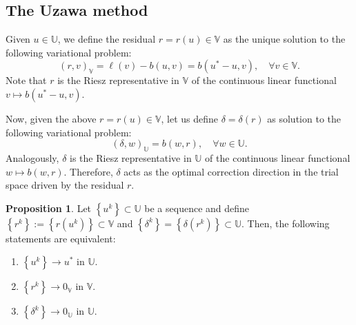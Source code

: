 \documentclass{article}
\theoremstyle{definition}
\newtheorem{proposition}{Proposition}
\begin{document}
\subsection{The Uzawa method}
Given $u\in\mathbb U$, we define the residual $r=r(u)\in\mathbb V$ as the unique solution to the following variational problem:
\begin{equation}\label{eq:residual}
(r,v)_{\mathbb{V}} = \ell(v) - b(u,v)=b(u^*-u,v), \quad \forall v\in \mathbb{V}.
\end{equation} Note that $r$ is the Riesz representative in $\mathbb{V}$ of the continuous linear functional $v\mapsto b(u^*-u,v)$.

Now, given the above $r=r(u)\in\mathbb{V}$, let us define $\delta=\delta(r)$ as solution to the following variational problem:
\begin{equation}\label{eq:delta}
(\delta,w)_{\mathbb{U}} = b(w,r), \quad \forall w\in \mathbb{U}.
\end{equation}
Analogously, $\delta$ is the Riesz representative in $\mathbb{U}$ of the continuous linear functional $w \mapsto b(w,r)$. Therefore, $\delta$ acts as the optimal correction direction in the trial space driven by the residual $r$.
\begin{proposition}\label{prop:equivalences}
Let $\left\{u^k\right\}\subset\mathbb U$ be a sequence and define $\left\{r^k\right\}:=\left\{r(u^k)\right\}\subset \mathbb V$ and 
$\left\{\delta^k\right\}=\left\{\delta(r^k)\right\}\subset\mathbb U$.
Then, the following statements are equivalent:
\begin{enumerate}
\item[(i)] $\left\{u^k\right\}\to u^*$ in $\mathbb U$.
\item[(ii)] $\left\{r^k\right\}\to 0_\mathbb V$ in $\mathbb V$.
\item[(iii)] $\left\{\delta^k\right\}\to 0_\mathbb U$ in $\mathbb U$.
\end{enumerate}
\end{proposition}
%
%
\end{document}

